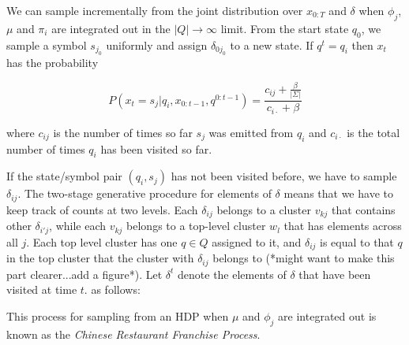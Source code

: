 We can sample incrementally from the joint distribution over $x_{0:T}$ and $\delta$ when $\phi_j$, $\mu$ and $\pi_i$ are integrated out in the $|Q|\rightarrow\infty$ limit.  From the start state $q_0$, we sample a symbol $s_{j_0}$ uniformly and assign $\delta_{0j_0}$ to a new state.  If $q^t = q_i$ then $x_t$ has the probability

 \[P(x_t=s_j|q_i,x_{0:t-1},q^{0:t-1}) = \frac{c_{ij}+\frac{\beta}{|\Sigma|}}{c_{i\cdot} + \beta}\]
 
 where $c_{ij}$ is the number of times so far $s_j$ was emitted from $q_i$ and $c_{i\cdot}$ is the total number of times $q_i$ has been visited so far.  
 
If the state/symbol pair $(q_i,s_j)$ has not been visited before, we have to sample $\delta_{ij}$.  The two-stage generative procedure for elements of $\delta$ means that we have to keep track of counts at two levels.  Each $\delta_{ij}$ belongs to a cluster $v_{kj}$ that contains other $\delta_{i'j}$, while each $v_{kj}$ belongs to a top-level cluster $w_{l}$ that has elements across all $j$.  Each top level cluster has one $q \in Q$ assigned to it, and $\delta_{ij}$ is equal to that $q$ in the top cluster that the cluster with $\delta_{ij}$ belongs to (*might want to make this part clearer...add a figure*).  Let $\delta^t$ denote the elements of $\delta$ that have been visited at time $t$.  as follows:
 
 
 This process for sampling from an HDP when $\mu$ and $\phi_j$ are integrated out is known as the {\em Chinese Restaurant Franchise Process}.
